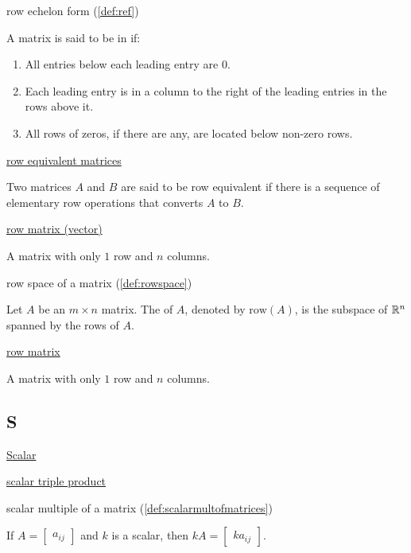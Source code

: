 \documentclass{ximera}
\begin{document}

row echelon form (\ref{def:ref})
\begin{expandable}
    A matrix is said to be in  if:
\begin{enumerate}
\item All entries below each leading entry are 0.
\item Each leading entry is in a column to the right of the leading entries in the rows above it.
\item All rows of zeros, if there are any, are located below non-zero rows.
\end{enumerate}
\end{expandable}

\href{https://ximera.osu.edu/oerlinalg/LinearAlgebra/SYS-0020/main}{row equivalent matrices}
\begin{expandable}
    Two matrices $A$ and $B$ are said to be row equivalent if there is a sequence of elementary row operations that converts $A$ to $B$.
\end{expandable}

\href{https://ximera.osu.edu/oerlinalg/LinearAlgebra/MAT-0010/main}{row matrix (vector)}
\begin{expandable}
    A matrix with only $1$ row and $n$ columns.
\end{expandable}

row space of a matrix (\ref{def:rowspace})
\begin{expandable}
    Let $A$ be an $m\times n$ matrix.  The  of $A$, denoted by $\mbox{row}(A)$, is the subspace of $\mathbb{R}^n$ spanned by the rows of $A$.
\end{expandable}


\href{https://ximera.osu.edu/oerlinalg/LinearAlgebra/MAT-0010/main}{row matrix}
\begin{expandable}
    A matrix with only $1$ row and $n$ columns.
\end{expandable}


\subsection*{S}
\href{https://ximera.osu.edu/oerlinalg/LinearAlgebra/VEC-0010/main}{Scalar}

\href{https://ximera.osu.edu/oerlinalg/LinearAlgebra/DET-0070/main}{scalar triple product}

scalar multiple of a matrix
(\ref{def:scalarmultofmatrices})
\begin{expandable}
    If $A=\begin{bmatrix} a_{ij}\end{bmatrix} $ and $k$ is a scalar,
then $kA=\begin{bmatrix} ka_{ij}\end{bmatrix}$. 
\end{expandable}
\end{document}
